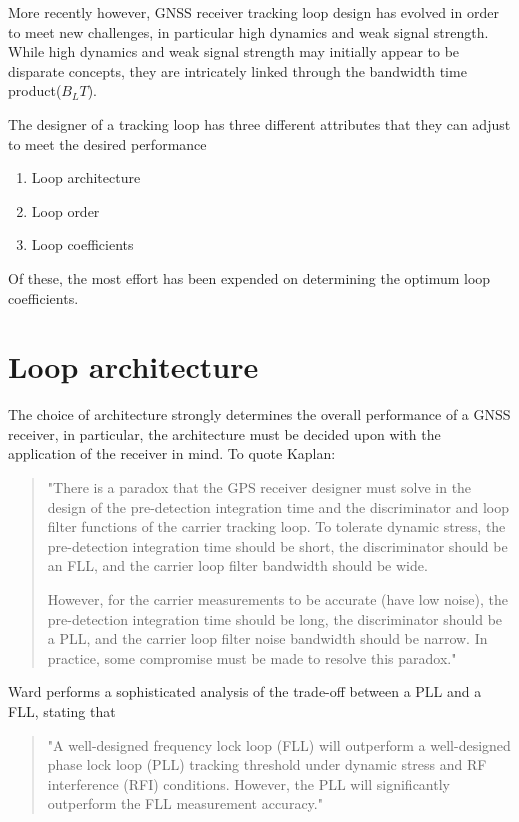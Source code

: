 More recently however, GNSS receiver tracking loop design has evolved in order to meet new challenges, in particular high dynamics and weak signal strength. While high dynamics and weak signal strength may initially appear to be disparate concepts, they are intricately linked through the bandwidth time product($B_LT$). 

The designer of a tracking loop has three different attributes that they can adjust to meet the desired performance 
\begin{enumerate}
\item{Loop architecture}
\item{Loop order}
\item{Loop coefficients}
\end{enumerate}

Of these, the most effort has been expended on determining the optimum loop coefficients. 

\section{Loop architecture}

The choice of architecture strongly determines the overall performance of a \ac{GNSS} receiver, in particular, the architecture must be decided upon with the application of the receiver in mind. To quote Kaplan: 
\begin{quotation}
"There is a paradox that the GPS receiver designer must solve in the design of the pre-detection integration time and the discriminator and loop filter functions of the carrier tracking loop. To tolerate dynamic stress, the pre-detection integration time should be short, the discriminator should be an \ac{FLL}, and the carrier loop filter bandwidth should be wide.

However, for the carrier measurements to be accurate (have low noise), the pre-detection integration time should be long, the discriminator should be a \ac{PLL}, and the carrier loop filter noise bandwidth should be narrow. In practice, some compromise must be made to resolve this paradox."\cite{Kaplan}
\end{quotation}

Ward performs a sophisticated analysis of the trade-off between a \ac{PLL} and a \ac{FLL}, stating that 
\begin{quotation}
"A well-designed frequency lock loop (FLL) will outperform
a well-designed phase lock loop (PLL) tracking threshold
under dynamic stress and RF interference (RFI) conditions.
However, the PLL will significantly outperform the FLL
measurement accuracy."\cite{ward1998}
\end{quotation}

